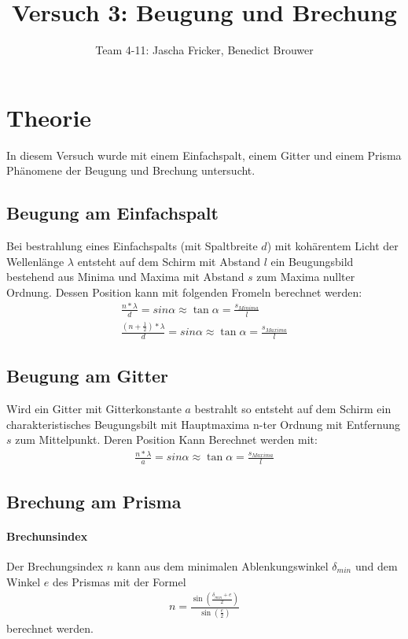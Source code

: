 \documentclass[11pt, a4paper]{article}
\title{Versuch 3: Beugung und Brechung}
\author{Team 4-11: Jascha Fricker, Benedict Brouwer}
\begin{document}
    \maketitle

    \tableofcontents

    \newpage

    \section{Theorie}
    \FloatBarrier
    In diesem Versuch wurde mit einem Einfachspalt, einem Gitter und einem Prisma Phänomene der Beugung und Brechung untersucht. 

    \subsection{Beugung am Einfachspalt}
    Bei bestrahlung eines Einfachspalts (mit Spaltbreite $d$) mit kohärentem Licht der Wellenlänge $\lambda$ entsteht auf dem Schirm mit Abstand $l$ ein Beugungsbild bestehend aus Minima und Maxima mit Abstand $s$ zum Maxima nullter Ordnung. Dessen Position kann mit folgenden Fromeln berechnet werden:
    \begin{align}
        \frac{n * \lambda}{d} = sin{\alpha} \approx \tan{\alpha} = \frac{s_{Minima}}{l} \label{eq:einfachspalt} \\
        \frac{(n + \frac{1}{2})* \lambda}{d} = sin{\alpha} \approx \tan{\alpha} = \frac{s_{Maxima}}{l} 
    \end{align}
    \subsection{Beugung am Gitter}
    Wird ein Gitter mit Gitterkonstante $a$ bestrahlt so entsteht auf dem Schirm ein charakteristisches Beugungsbilt mit Hauptmaxima n-ter Ordnung mit Entfernung $s$ zum Mittelpunkt. Deren Position Kann Berechnet werden mit:
    \begin{align}
        \frac{n * \lambda}{a} = sin{\alpha} \approx \tan{\alpha} = \frac{s_{Maxima}}{l} \label{eq:Gitter} 
    \end{align}

    \subsection{Brechung am Prisma}

    \paragraph{Brechunsindex}
    Der Brechungsindex $n$ kann aus dem minimalen Ablenkungswinkel $\delta_{min}$ und dem Winkel $e$ des Prismas mit der Formel
    \begin{align}
        n = \frac{\sin\left(\frac{\delta_{min} + e}{2}\right)}{\sin\left(\frac{e}{2}\right)} \label{eq:brechungsindex}
    \end{align}
    berechnet werden.
    
\end{document}
